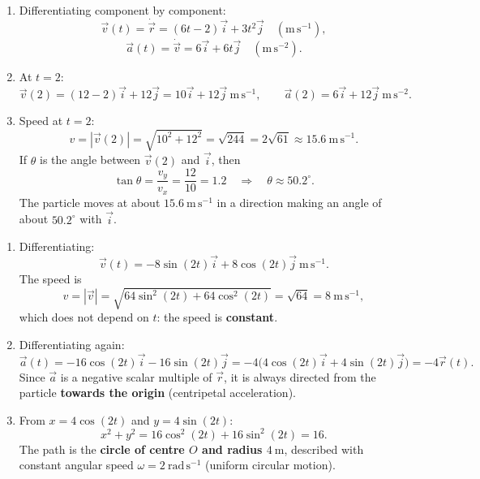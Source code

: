 \documentclass[11pt]{article}
\begin{document}
\begin{corrige}
\begin{enumerate}
\item Differentiating component by component:
\[ \vec{v}(t) = \dot{\vec{r}} = (6t - 2)\vec{i} + 3t^2\vec{j} \quad (\mathrm{m\,s^{-1}}), \]
\[ \vec{a}(t) = \dot{\vec{v}} = 6\vec{i} + 6t\vec{j} \quad (\mathrm{m\,s^{-2}}). \]
\item At $t = 2$:
\[ \vec{v}(2) = (12 - 2)\vec{i} + 12\vec{j} = 10\vec{i} + 12\vec{j}\ \mathrm{m\,s^{-1}}, \qquad \vec{a}(2) = 6\vec{i} + 12\vec{j}\ \mathrm{m\,s^{-2}}. \]
\item Speed at $t = 2$:
\[ v = |\vec{v}(2)| = \sqrt{10^2 + 12^2} = \sqrt{244} = 2\sqrt{61} \approx 15.6\ \mathrm{m\,s^{-1}}. \]
If $\theta$ is the angle between $\vec{v}(2)$ and $\vec{i}$, then
\[ \tan\theta = \frac{v_y}{v_x} = \frac{12}{10} = 1.2 \quad\Longrightarrow\quad \theta \approx 50.2^{\circ}. \]
The particle moves at about $15.6\ \mathrm{m\,s^{-1}}$ in a direction making an angle of about $50.2^{\circ}$ with $\vec{i}$.
\end{enumerate}
\end{corrige}

\begin{corrige}
\begin{enumerate}
\item Differentiating:
\[ \vec{v}(t) = -8\sin(2t)\vec{i} + 8\cos(2t)\vec{j}\ \mathrm{m\,s^{-1}}. \]
The speed is
\[ v = |\vec{v}| = \sqrt{64\sin^2(2t) + 64\cos^2(2t)} = \sqrt{64} = 8\ \mathrm{m\,s^{-1}}, \]
which does not depend on $t$: the speed is \textbf{constant}.
\item Differentiating again:
\[ \vec{a}(t) = -16\cos(2t)\vec{i} - 16\sin(2t)\vec{j} = -4\bigl(4\cos(2t)\vec{i} + 4\sin(2t)\vec{j}\bigr) = -4\vec{r}(t). \]
Since $\vec{a}$ is a negative scalar multiple of $\vec{r}$, it is always directed from the particle \textbf{towards the origin} (centripetal acceleration).
\item From $x = 4\cos(2t)$ and $y = 4\sin(2t)$:
\[ x^2 + y^2 = 16\cos^2(2t) + 16\sin^2(2t) = 16. \]
The path is the \textbf{circle of centre $O$ and radius $4\ \mathrm{m}$}, described with constant angular speed $\omega = 2\ \mathrm{rad\,s^{-1}}$ (uniform circular motion).
\end{enumerate}
\end{corrige}
\end{document}
